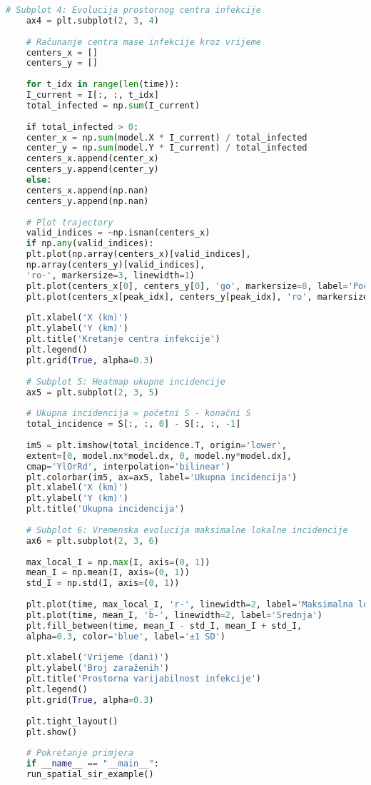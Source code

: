 \documentclass[11pt,oneside]{book}
\begin{document}
\begin{lstlisting}[language=Python, caption=SIR model s prostornom difuzijom]
	# Subplot 4: Evolucija prostornog centra infekcije
	ax4 = plt.subplot(2, 3, 4)
	
	# Računanje centra mase infekcije kroz vrijeme
	centers_x = []
	centers_y = []
	
	for t_idx in range(len(time)):
	I_current = I[:, :, t_idx]
	total_infected = np.sum(I_current)
	
	if total_infected > 0:
	center_x = np.sum(model.X * I_current) / total_infected
	center_y = np.sum(model.Y * I_current) / total_infected
	centers_x.append(center_x)
	centers_y.append(center_y)
	else:
	centers_x.append(np.nan)
	centers_y.append(np.nan)
	
	# Plot trajectory
	valid_indices = ~np.isnan(centers_x)
	if np.any(valid_indices):
	plt.plot(np.array(centers_x)[valid_indices], 
	np.array(centers_y)[valid_indices], 
	'ro-', markersize=3, linewidth=1)
	plt.plot(centers_x[0], centers_y[0], 'go', markersize=8, label='Početak')
	plt.plot(centers_x[peak_idx], centers_y[peak_idx], 'ro', markersize=8, label='Vrhunac')
	
	plt.xlabel('X (km)')
	plt.ylabel('Y (km)')
	plt.title('Kretanje centra infekcije')
	plt.legend()
	plt.grid(True, alpha=0.3)
	
	# Subplot 5: Heatmap ukupne incidencije
	ax5 = plt.subplot(2, 3, 5)
	
	# Ukupna incidencija = početni S - konačni S
	total_incidence = S[:, :, 0] - S[:, :, -1]
	
	im5 = plt.imshow(total_incidence.T, origin='lower',
	extent=[0, model.nx*model.dx, 0, model.ny*model.dx],
	cmap='YlOrRd', interpolation='bilinear')
	plt.colorbar(im5, ax=ax5, label='Ukupna incidencija')
	plt.xlabel('X (km)')
	plt.ylabel('Y (km)')
	plt.title('Ukupna incidencija')
	
	# Subplot 6: Vremenska evolucija maksimalne lokalne incidencije
	ax6 = plt.subplot(2, 3, 6)
	
	max_local_I = np.max(I, axis=(0, 1))
	mean_I = np.mean(I, axis=(0, 1))
	std_I = np.std(I, axis=(0, 1))
	
	plt.plot(time, max_local_I, 'r-', linewidth=2, label='Maksimalna lokalna')
	plt.plot(time, mean_I, 'b-', linewidth=2, label='Srednja')
	plt.fill_between(time, mean_I - std_I, mean_I + std_I, 
	alpha=0.3, color='blue', label='±1 SD')
	
	plt.xlabel('Vrijeme (dani)')
	plt.ylabel('Broj zaraženih')
	plt.title('Prostorna varijabilnost infekcije')
	plt.legend()
	plt.grid(True, alpha=0.3)
	
	plt.tight_layout()
	plt.show()
	
	# Pokretanje primjera
	if __name__ == "__main__":
	run_spatial_sir_example()
\end{lstlisting}
\end{document}
